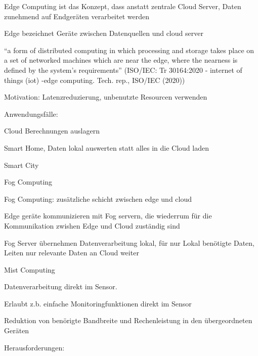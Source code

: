 \begin{notes}
\begin{notes}
\begin{notes}
            \item Edge Computing ist das Konzept, dass anstatt zentrale Cloud Server, Daten zunehmend auf Endgeräten verarbeitet werden \cite{Shi2016}
            \item Edge bezeichnet Geräte zwischen Datenquellen und cloud server
            \item “a form of distributed computing in which processing and storage takes place on a set of networked machines which are near the edge, where the nearness is defined by the system’s requirements”  (ISO/IEC: Tr 30164:2020 - internet of things (iot) -edge computing. Tech. rep., ISO/IEC (2020))
            \item Motivation: Latenzreduzierung, unbenutzte Resourcen verwenden
            \item Anwendungsfälle:
            \begin{notes}
                \item Cloud Berechnungen auslagern
                \item Smart Home, Daten lokal auswerten statt alles in die Cloud laden
                \item Smart City
            \end{notes}
        \end{notes}
        \item Fog Computing
        \begin{notes} 
            \item Fog Computing: zusätzliche schicht zwischen edge und cloud
            \item Edge geräte kommunizieren mit Fog servern, die wiederrum für die Kommunikation zwishen Edge und Cloud zuständig sind
            \item Fog Server übernehmen Datenverarbeitung lokal, für nur Lokal benötigte Daten, Leiten nur relevante Daten an Cloud weiter
        \end{notes}
        \item Mist Computing
        \begin{notes} 
            \item Datenverarbeitung direkt im Sensor.
            \item Erlaubt z.b. einfache Monitoringfunktionen direkt im Sensor
            \item Reduktion von benörigte Bandbreite und Rechenleistung in den übergeordneten Geräten
        \end{notes}
        \item Herausforderungen:

\end{notes}
\end{notes}
